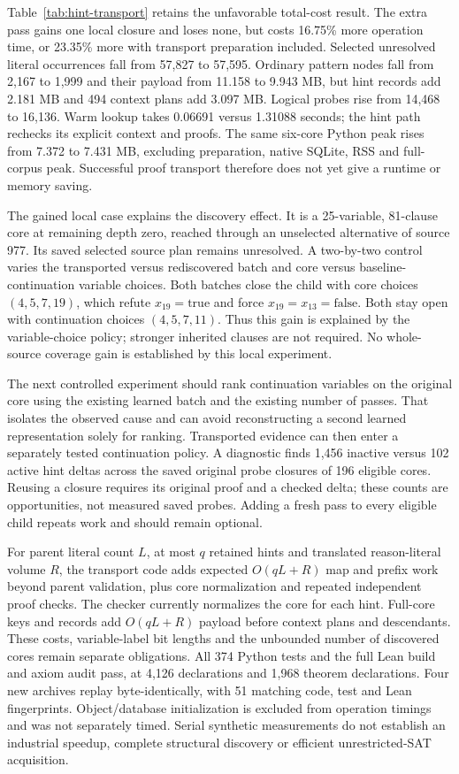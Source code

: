 \documentclass[11pt,a4paper]{article}
\numberwithin{equation}{section}
\theoremstyle{plain}
\theoremstyle{definition}
\theoremstyle{remark}
\begin{document}
Table~\ref{tab:hint-transport} retains the unfavorable total-cost result. The extra pass gains one local closure and loses none, but costs 16.75\% more operation time, or 23.35\% more with transport preparation included. Selected unresolved literal occurrences fall from 57,827 to 57,595. Ordinary pattern nodes fall from 2,167 to 1,999 and their payload from 11.158 to 9.943 MB, but hint records add 2.181 MB and 494 context plans add 3.097 MB. Logical probes rise from 14,468 to 16,136. Warm lookup takes 0.06691 versus 1.31088 seconds; the hint path rechecks its explicit context and proofs. The same six-core Python peak rises from 7.372 to 7.431 MB, excluding preparation, native SQLite, RSS and full-corpus peak. Successful proof transport therefore does not yet give a runtime or memory saving.

The gained local case explains the discovery effect. It is a 25-variable, 81-clause core at remaining depth zero, reached through an unselected alternative of source 977. Its saved selected source plan remains unresolved. A two-by-two control varies the transported versus rediscovered batch and core versus baseline-continuation variable choices. Both batches close the child with core choices $(4,5,7,19)$, which refute $x_{19}=\mathrm{true}$ and force $x_{19}=x_{13}=\mathrm{false}$. Both stay open with continuation choices $(4,5,7,11)$. Thus this gain is explained by the variable-choice policy; stronger inherited clauses are not required. No whole-source coverage gain is established by this local experiment.

The next controlled experiment should rank continuation variables on the original core using the existing learned batch and the existing number of passes. That isolates the observed cause and can avoid reconstructing a second learned representation solely for ranking. Transported evidence can then enter a separately tested continuation policy. A diagnostic finds 1,456 inactive versus 102 active hint deltas across the saved original probe closures of 196 eligible cores. Reusing a closure requires its original proof and a checked delta; these counts are opportunities, not measured saved probes. Adding a fresh pass to every eligible child repeats work and should remain optional.

For parent literal count $L$, at most $q$ retained hints and translated reason-literal volume $R$, the transport code adds expected $O(qL+R)$ map and prefix work beyond parent validation, plus core normalization and repeated independent proof checks. The checker currently normalizes the core for each hint. Full-core keys and records add $O(qL+R)$ payload before context plans and descendants. These costs, variable-label bit lengths and the unbounded number of discovered cores remain separate obligations. All 374 Python tests and the full Lean build and axiom audit pass, at 4,126 declarations and 1,968 theorem declarations. Four new archives replay byte-identically, with 51 matching code, test and Lean fingerprints. Object/database initialization is excluded from operation timings and was not separately timed. Serial synthetic measurements do not establish an industrial speedup, complete structural discovery or efficient unrestricted-SAT acquisition.
\end{document}
